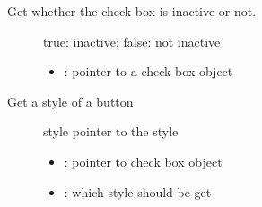 \documentclass[letterpaper,10pt,english]{sphinxmanual}
\begin{document}

\begin{fulllineitems}
\label{\detokenize{object-types/cb:_CPPv417lv_cb_is_inactivePK8lv_obj_t}}%
\pysigstartmultiline
{}\label{\detokenize{object-types/cb:lv__cb_8h_1a9b428c66c36c0f34d05f3588ea622e12}}%
\pysigstopmultiline
Get whether the check box is inactive or not. \begin{description}
\item[{}] \leavevmode
true: inactive; false: not inactive 

\item[{}] \leavevmode\begin{itemize}
\item {} 
: pointer to a check box object 

\end{itemize}

\end{description}


\end{fulllineitems}


\begin{fulllineitems}
\label{\detokenize{object-types/cb:_CPPv415lv_cb_get_stylePK8lv_obj_t13lv_cb_style_t}}%
\pysigstartmultiline
{}\label{\detokenize{object-types/cb:lv__cb_8h_1a2b9d51bacc5a529324c493202c0c94ff}}%
\pysigstopmultiline
Get a style of a button \begin{description}
\item[{}] \leavevmode
style pointer to the style 

\item[{}] \leavevmode\begin{itemize}
\item {} 
: pointer to check box object 

\item {} 
: which style should be get 

\end{itemize}

\end{description}


\end{fulllineitems}
\end{document}
